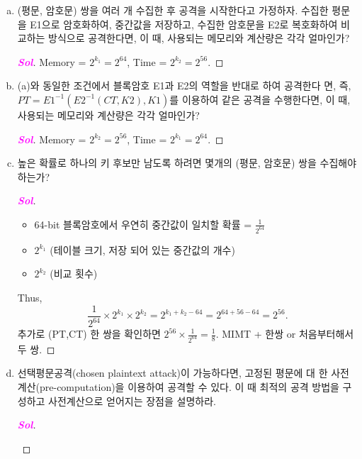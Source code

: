 \begin{enumerate}[\bf 1.]
\begin{center}
	\end{center}
	\begin{enumerate}[(a)]
		\item (평문, 암호문) 쌍을 여러 개 수집한 후 공격을 시작한다고 가정하자.
		수집한 평문을 E1으로 암호화하여, 중간값을 저장하고, 수집한 암호문을 E2로
		복호화하여 비교하는 방식으로 공격한다면, 이 때, 사용되는 메모리와 계산량은
		각각 얼마인가?
		\begin{proof}[\textcolor{magenta}{\bf Sol}]
		Memory = $2^{k_1}=2^{64}$, Time = $2^{k_2}=2^{56}$.
		\end{proof}
		\item (a)와 동일한 조건에서 블록암호 E1과 E2의 역할을 반대로 하여 공격한다
		면, 즉, $PT = E1^{-1} (E2^{-1} (CT, K2), K1)$를 이용하여 같은 공격을 수행한다면,
		이 때, 사용되는 메모리와 계산량은 각각 얼마인가?
		\begin{proof}[\textcolor{magenta}{\bf Sol}]
		Memory = $2^{k_2}=2^{56}$, Time = $2^{k_1}=2^{64}$.
		\end{proof}
		\item 높은 확률로 하나의 키 후보만 남도록 하려면 몇개의 (평문, 암호문) 쌍을
		수집해야 하는가?
		\begin{proof}[\textcolor{magenta}{\bf Sol}]
			\ \begin{itemize}
				\item 64-bit 블록암호에서 우연히 중간값이 일치할 확률 = $\frac{1}{2^{64}}$
				\item $2^{k_1}$ (테이블 크기, 저장 되어 있는 중간값의 개수)
				\item $2^{k_2}$ (비교 횟수)
			\end{itemize} Thus, \[
			\frac{1}{2^{64}}\times 2^{k_1}\times 2^{k_2}=2^{k_1+k_2-64}=2^{64+56-64}=2^{56}.
			\] 추가로 (PT,CT) 한 쌍을 확인하면 $2^{56}\times\frac{1}{2^{64}}=\frac{1}{8}$.
			MIMT + 한쌍 or 처음부터해서 두 쌍.
		\end{proof}
		\item 선택평문공격(chosen plaintext attack)이 가능하다면, 고정된 평문에 대
		한 사전계산(pre-computation)을 이용하여 공격할 수 있다. 이 때 최적의 공격
		방법을 구성하고 사전계산으로 얻어지는 장점을 설명하라.
		\begin{proof}[\textcolor{magenta}{\bf Sol}]
			\ \begin{enumerate}

\end{enumerate}
\end{proof}
\end{enumerate}
\end{enumerate}
